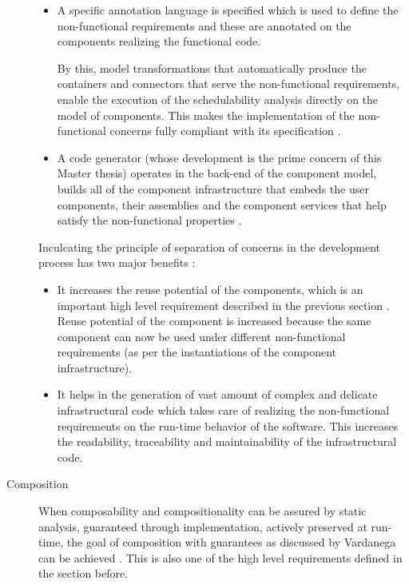 \begin{description}
\begin{itemize}
\item A specific annotation language is specified which is used to define the non-functional requirements and these are annotated on the components realizing the functional code.

By this, model transformations that automatically produce the containers and connectors that serve the non-functional requirements, enable the execution of the schedulability analysis directly on the model of components. This makes the implementation of the non-functional concerns fully compliant with its specification \cite{ScheduAnaly}. 

\item A code generator (whose development is the prime concern of this Master thesis) operates in the back-end of the component model, builds all of the component infrastructure that embeds the user components, their assemblies and the component services that help satisfy the non-functional properties \cite{CharEvoRAVCodeAr}. 
\end{itemize}

Inculcating the principle of separation of concerns in the development process has two major benefits \cite{CompBasedProcess}:

\begin{itemize}
\item It increases the reuse potential of the components, which is an important high level requirement described in the previous section \cite{SAVOIR}. Reuse potential of the component is increased because the same component can now be used under different non-functional requirements (as per the instantiations of the component infrastructure).

\item It helps in the generation of vast amount of complex and delicate infrastructural code which takes care of realizing the non-functional requirements on the run-time behavior of the software. This increases the readability, traceability and maintainability of the infrastructural code. 
\end{itemize}

\item [Composition] 
\label{section: Founding principle-Composition}
When composability and compositionality can be assured by static analysis, guaranteed through implementation, actively preserved at run-time, the goal of composition with guarantees as discussed by Vardanega can be achieved \cite{CompBasedProcess}. This is also one of the high level requirements defined in the section before.
 

\end{description}
